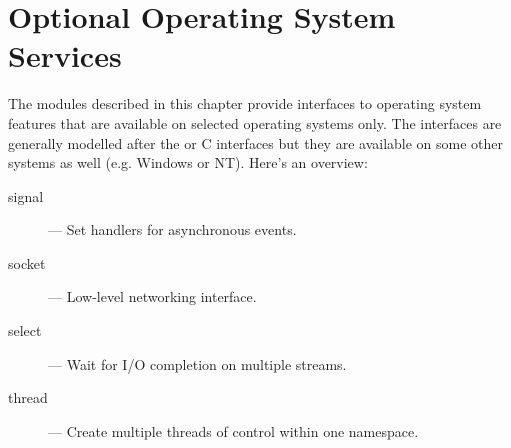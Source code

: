\chapter{Optional Operating System Services}

The modules described in this chapter provide interfaces to operating
system features that are available on selected operating systems only.
The interfaces are generally modelled after the \UNIX{} or C
interfaces but they are available on some other systems as well
(e.g. Windows or NT).  Here's an overview:

\begin{description}

\item[signal]
--- Set handlers for asynchronous events.

\item[socket]
--- Low-level networking interface.

\item[select]
--- Wait for I/O completion on multiple streams.

\item[thread]
--- Create multiple threads of control within one namespace.

\end{description}
